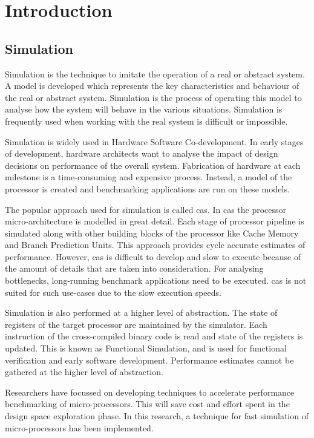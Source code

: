 \chapter{Introduction}\label{chapter:introduction}

\section{Simulation}

Simulation is the technique to imitate the operation of a real or abstract system. A model is developed which represents the key characteristics and behaviour of the real or abstract system. Simulation is the process of operating this model to analyse how the system will behave in the various situations. Simulation is frequently used when working with the real system is difficult or impossible.

Simulation is widely used in Hardware Software Co-development. In early stages of development, hardware architects want to analyse the impact of design decisions on performance of the overall system. Fabrication of hardware at each milestone is a time-consuming and expensive process. Instead, a model of the processor is created and benchmarking applications are run on these models.

The popular approach used for simulation is called \gls{cas}. In \gls{cas} the processor micro-architecture is modelled in great detail. Each stage of processor pipeline is simulated along with other building blocks of the processor like Cache Memory and Branch Prediction Units. This approach provides cycle accurate estimates of performance. However, \gls{cas} is difficult to develop and slow to execute because of the amount of details that are taken into consideration. For analysing bottlenecks, long-running benchmark applications need to be executed. \gls{cas} is not suited for such use-cases due to the slow execution speeds.

Simulation is also performed at a higher level of abstraction. The state of registers of the target processor are maintained by the simulator. Each instruction of the cross-compiled binary code is read and state of the registers is updated. This is known as Functional Simulation, and is used for functional verification and early software development. Performance estimates cannot be gathered at the higher level of abstraction.

Researchers have focussed on developing techniques to accelerate performance benchmarking of micro-processors. This will save cost and effort spent in the design space exploration phase. In this research, a technique for fast simulation of micro-processors has been implemented. 

